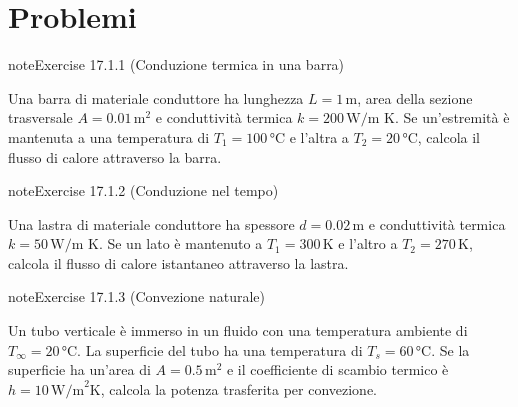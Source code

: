 \documentclass[letterpaper,10pt,italian]{jupyterBook}
\begin{document}
\section{Problemi}
\label{\detokenize{ch/thermodynamics/heat-transmission-problems:problemi}}\label{\detokenize{ch/thermodynamics/heat-transmission-problems:physics-hs-thermodynamics-heat-transmission-problems}}\label{\detokenize{ch/thermodynamics/heat-transmission-problems::doc}} \label{exercise:ch/thermodynamics/heat-transmission-problems-exercise-0}

\begin{sphinxadmonition}{note}{Exercise 17.1.1 (Conduzione termica in una barra)}



\sphinxAtStartPar
Una barra di materiale conduttore ha lunghezza \(L = 1 \, \text{m}\), area della sezione trasversale \(A = 0.01 \, \text{m}^2\) e conduttività termica \(k = 200 \, \text{W/m K}\). Se un’estremità è mantenuta a una temperatura di \(T_1 = 100 \, \text{°C}\) e l’altra a \(T_2 = 20 \, \text{°C}\), calcola il flusso di calore attraverso la barra.
\end{sphinxadmonition}
 \label{exercise:ch/thermodynamics/heat-transmission-problems-exercise-1}

\begin{sphinxadmonition}{note}{Exercise 17.1.2 (Conduzione nel tempo)}



\sphinxAtStartPar
Una lastra di materiale conduttore ha spessore \(d = 0.02 \, \text{m}\) e conduttività termica \(k = 50 \, \text{W/m K}\). Se un lato è mantenuto a \(T_1 = 300 \, \text{K}\) e l’altro a \(T_2 = 270 \, \text{K}\), calcola il flusso di calore istantaneo attraverso la lastra.
\end{sphinxadmonition}
 \label{exercise:ch/thermodynamics/heat-transmission-problems-exercise-2}

\begin{sphinxadmonition}{note}{Exercise 17.1.3 (Convezione naturale)}



\sphinxAtStartPar
Un tubo verticale è immerso in un fluido con una temperatura ambiente di \(T_\infty = 20 \, \text{°C}\). La superficie del tubo ha una temperatura di \(T_s = 60 \, \text{°C}\). Se la superficie ha un’area di \(A = 0.5 \, \text{m}^2\) e il coefficiente di scambio termico è \(h = 10 \, \text{W/m}^2\text{K}\), calcola la potenza trasferita per convezione.
\end{sphinxadmonition}
 \label{exercise:ch/thermodynamics/heat-transmission-problems-exercise-3}
\end{document}
